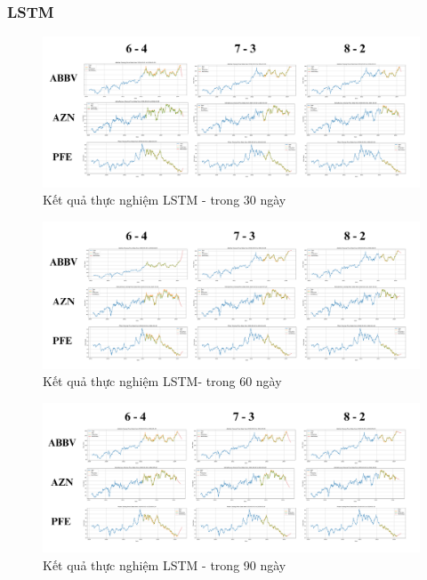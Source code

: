 \documentclass[conference]{IEEEtran}
\begin{document}
\subsubsection{LSTM}
\begin{figure}[H]
    \centering
    \begin{minipage}{0.5\textwidth}
    \centering
    \includegraphics[width=1\textwidth]{Image/LSTM30.png}
    \caption{Kết quả thực nghiệm LSTM - trong 30 ngày}
    \label{fig:1}
    \end{minipage}
\end{figure}
\begin{figure}[H]
    \centering
    \begin{minipage}{0.5\textwidth}
    \centering
    \includegraphics[width=1\textwidth]{Image/LSTM60.png}
    \caption{Kết quả thực nghiệm LSTM- trong 60 ngày}
    \label{fig:1}
    \end{minipage}
\end{figure}
\begin{figure}[H]
    \centering
    \begin{minipage}{0.5\textwidth}
    \centering
    \includegraphics[width=1\textwidth]{Image/LSTM90.png}
    \caption{Kết quả thực nghiệm LSTM - trong 90 ngày}
    \label{fig:1}
    \end{minipage}
\end{figure}
\end{document}
